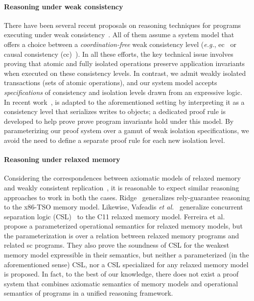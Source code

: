 \paragraph{Reasoning under weak consistency} There have been several
recent proposals on reasoning techniques for programs executing under
weak consistency~\cite{bailisvldb, alvarocalm,
  gotsmanpopl16,redblueatc, redblueosdi, ecinec}. All of them assume a
system model that offers a choice between a \emph{coordination-free}
weak consistency level (\emph{e.g.}, {\sc ec}~\cite{redblueosdi,
  redblueatc, ecinec, alvarocalm, bailisvldb} or causal consistency
({\sc cc})~\cite{gotsmanpopl16}). In all these efforts, the key
technical issue involves proving that atomic and fully isolated
operations preserve application invariants when executed on these
consistency levels.  In contrast, we admit weakly isolated
transactions (sets of atomic operations), and our system model accepts
\emph{specifications} of consistency and isolation levels drawn from
an expressive logic.  In recent work~\cite{gotsmanpopl16},
 is adapted to the aforementioned
setting by interpreting it as a consistency level that serializes
writes to objects; a dedicated proof rule is developed to help prove
prove program invariants hold under this model. By parameterizing our
proof system over a gamut of weak isolation specifications, we avoid
the need to define a separate proof rule for each new isolation level.

\paragraph{Reasoning under relaxed memory} Considering the
correspondences between axiomatic models of relaxed
memory~\cite{battycpp} and weakly consistent
replication~\cite{burckhardt14}, it is reasonable to expect similar
reasoning approaches to work in both the cases. Ridge~\cite{rgtso}
generalizes rely-guarantee reasoning to the x86-TSO memory model.
Likewise, Vafeadis \emph{et al.}~\cite{rsl13} generalize concurrent
separation logic (CSL)~\cite{csl} to the C11 relaxed memory model.
Ferreira et al.~\cite{ferreira10} propose a parameterized operational
semantics for relaxed memory models, but the parameterization is over
a relation between relaxed memory programs and related {\sc sc}
programs. They also prove the soundness of CSL for the weakest memory
model expressible in their semantics, but neither a parameterized (in
the aforementioned sense) CSL, nor a CSL specialized for any relaxed
memory model is proposed. In fact, to the best of our knowledge, there
does not exist a proof system that combines axiomatic semantics of
memory models and operational semantics of programs in a unified
reasoning framework.  

